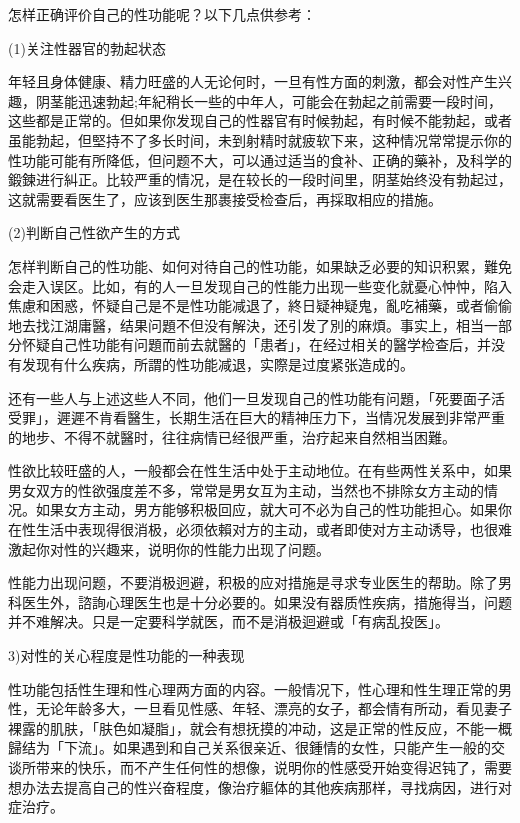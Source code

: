 \documentclass[12pt,UTF8]{ctexbook}
\begin{document}
怎样正确评价自己的性功能呢？以下几点供参考：

(1)关注性器官的勃起状态

年轻且身体健康、精力旺盛的人无论何时，一旦有性方面的刺激，都会对性产生兴趣，阴茎能迅速勃起;年紀稍长一些的中年人，可能会在勃起之前需要一段时间，这些都是正常的。但如果你发现自己的性器官有时候勃起，有时候不能勃起，或者虽能勃起，但堅持不了多长时间，未到射精时就疲软下来，这种情况常常提示你的性功能可能有所降低，但问题不大，可以通过适当的食补、正确的藥补，及科学的鍛鍊进行糾正。比较严重的情况，是在较长的一段时间里，阴茎始终没有勃起过，这就需要看医生了，应该到医生那裹接受检查后，再採取相应的措施。

(2)判断自己性欲产生的方式

怎样判断自己的性功能、如何对待自己的性功能，如果缺乏必要的知识积累，難免会走入误区。比如，有的人一旦发现自己的性能力出现一些变化就憂心忡忡，陷入焦慮和困惑，怀疑自己是不是性功能减退了，終日疑神疑鬼，亂吃補藥，或者偷偷地去找江湖庸醫，结果问題不但没有解決，还引发了別的麻煩。事实上，相当一部分怀疑自己性功能有问題而前去就醫的「患者」，在经过相关的醫学检查后，并没有发现有什么疾病，所謂的性功能减退，实際是过度紧张造成的。

还有一些人与上述这些人不同，他们一旦发现自己的性功能有问題，「死要面子活受罪」，遲遲不肯看醫生，长期生活在巨大的精神压力下，当情况发展到非常严重的地步、不得不就醫时，往往病情已经很严重，治疗起来自然相当困難。

性欲比较旺盛的人，一般都会在性生活中处于主动地位。在有些两性关系中，如果男女双方的性欲强度差不多，常常是男女互为主动，当然也不排除女方主动的情况。如果女方主动，男方能够积极回应，就大可不必为自己的性功能担心。如果你在性生活中表现得很消极，必须依賴对方的主动，或者即使对方主动诱导，也很难激起你对性的兴趣来，说明你的性能力出现了问题。

性能力出现问题，不要消极迥避，积极的应对措施是寻求专业医生的帮助。除了男科医生外，諮詢心理医生也是十分必要的。如果没有器质性疾病，措施得当，问题并不难解决。只是一定要科学就医，而不是消极迴避或「有病乱投医」。

3)对性的关心程度是性功能的一种表现

性功能包括性生理和性心理两方面的内容。一般情况下，性心理和性生理正常的男性，无论年龄多大，一旦看见性感、年轻、漂亮的女子，都会情有所动，看见妻子裸露的肌肤，「肤色如凝脂」，就会有想抚摸的冲动，这是正常的性反应，不能一概歸结为「下流」。如果遇到和自己关系很亲近、很鍾情的女性，只能产生一般的交谈所带来的快乐，而不产生任何性的想像，说明你的性感受开始变得迟钝了，需要想办法去提高自己的性兴奋程度，像治疗軀体的其他疾病那样，寻找病因，进行对症治疗。
\end{document}
